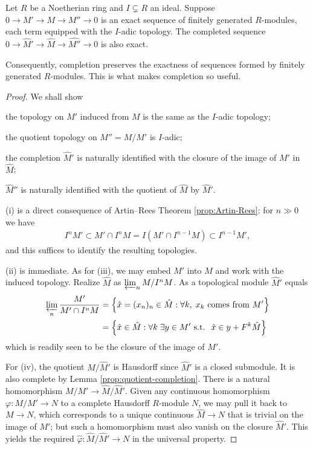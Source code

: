 \begin{proposition}\label{prop:completion-exactness}
	Let $R$ be a Noetherian ring and $I \subsetneq R$ an ideal. Suppose $0 \to M' \to M \to M'' \to 0$ is an exact sequence of finitely generated $R$-modules, each term equipped with the $I$-adic topology. The completed sequence $0 \to \hat{M}' \to \hat{M} \to \hat{M''} \to 0$ is also exact.
\end{proposition}
Consequently, completion preserves the exactness of sequences formed by finitely generated $R$-modules. This is what makes completion so useful.
\begin{proof}
	We shall show
	\begin{compactenum}[(i)]
		\item the topology on $M'$ induced from $M$ is the same as the $I$-adic topology;
		\item the quotient topology on $M'' = M/M'$ is $I$-adic;
		\item the completion $\hat{M}'$ is naturally identified with the closure of the image of $M'$ in $\hat{M}$;
		\item $\hat{M}''$ is naturally identified with the quotient of $\hat{M}$ by $\hat{M}'$.
	\end{compactenum}

	(i) is a direct consequence of Artin--Rees Theorem \ref{prop:Artin-Rees}: for $n \gg 0$ we have
	\begin{gather}\label{eqn:AR-induced-top}
		I^n M' \subset M' \cap I^n M = I (M' \cap I^{n-1} M) \subset I^{n-1} M',
	\end{gather}
	and this suffices to identify the resulting topologies.
	
	(ii) is immediate. As for (iii), we may embed $M'$ into $M$ and work with the induced topology. Realize $\hat{M}$ as $\varprojlim_n M/I^n M$. As a topological module $\hat{M}'$ equals
	\begin{align*}
		\varprojlim_n \frac{M'}{M' \cap I^n M} & = \left\{ \hat{x} = (x_n)_n \in \hat{M} : \forall k, \; x_k \text{ comes from } M' \right\} \\
		& = \left\{ \hat{x} \in \hat{M}: \forall k \; \exists y \in M' \text{ s.t. } \; \hat{x} \in y + F^k \hat{M} \right\}
	\end{align*}
	which is readily seen to be the closure of the image of $M'$.
	
	For (iv), the quotient $\hat{M}/\hat{M}'$ is Hausdorff since $\hat{M}'$ is a closed submodule. It is also complete by Lemma \ref{prop:quotient-completion}. There is a natural homomorphism $M/M' \to \hat{M}/\hat{M}'$. Given any continuous homomorphism $\varphi: M/M' \to N$ to a complete Hausdorff $R$-module $N$, we may pull it back to $M \to N$, which corresponds to a unique continuous $\hat{M} \to N$ that is trivial on the image of $M'$; but such a homomorphism must also vanish on the closure $\hat{M}'$. This yields the required $\hat{\varphi}: \hat{M}/\hat{M}' \to N$ in the universal property.
\end{proof}

